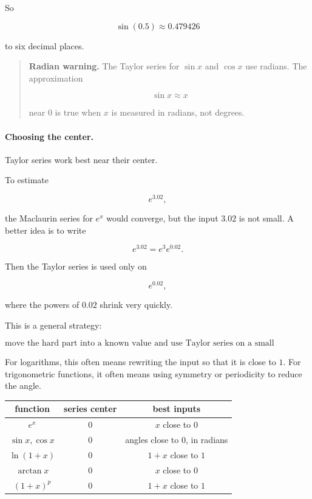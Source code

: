 So

\[
\boxed{
\sin(0.5)\approx0.479426
}
\]

to six decimal places.

\begin{quote}
\textbf{Radian warning.}
The Taylor series for \(\sin x\) and \(\cos x\) use radians.  The approximation

\[
\sin x\approx x
\]

near \(0\) is true when \(x\) is measured in radians, not degrees.
\end{quote}

\paragraph{Choosing the center.}
Taylor series work best near their center.

To estimate

\[
e^{3.02},
\]

the Maclaurin series for \(e^x\) would converge, but the input \(3.02\) is not small.
A better idea is to write

\[
e^{3.02}=e^3e^{0.02}.
\]

Then the Taylor series is used only on

\[
e^{0.02},
\]

where the powers of \(0.02\) shrink very quickly.

This is a general strategy:

\[
\boxed{
\text{move the hard part into a known value and use Taylor series on a small remainder.}
}
\]

For logarithms, this often means rewriting the input so that it is close to \(1\).  For
trigonometric functions, it often means using symmetry or periodicity to reduce the
angle.

\begin{center}
\renewcommand{\arraystretch}{1.4}
\begin{tabular}{c|c|c}
\textbf{function} & \textbf{series center} & \textbf{best inputs} \\ \hline
\(e^x\) & \(0\) & \(x\) close to \(0\) \\
\(\sin x,\cos x\) & \(0\) & angles close to \(0\), in radians \\
\(\ln(1+x)\) & \(0\) & \(1+x\) close to \(1\) \\
\(\arctan x\) & \(0\) & \(x\) close to \(0\) \\
\((1+x)^p\) & \(0\) & \(1+x\) close to \(1\)
\end{tabular}
\end{center}

